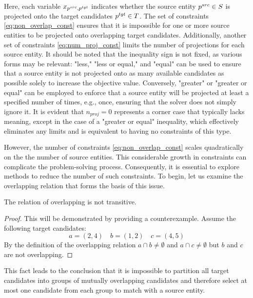 Here, each variable \( x_{p^{src}, p^{tgt}} \) indicates whether
the source entity \( p^{src} \in S \) is projected onto the target
candidates \( p^{tgt} \in T \). The set of constraints \eqref{eq:non_overlap_const}
ensures that it is impossible for one or more source entities to be
projected onto overlapping target candidates. Additionally, another
set of constraints \eqref{eq:num_proj_const} limits the number of
projections for each source entity. It should be noted that the
inequality sign is not fixed, as various forms may be relevant: "less,"
"less or equal," and "equal" can be used to ensure that a source entity
is not projected onto as many available candidates as possible solely to increase
the objective value. Conversely, "greater" or "greater or equal" can be
employed to enforce that a source entity will be projected at least a specified
number of times, e.g., once, ensuring that the solver does not simply ignore it.
It is evident that \( n_{proj} = 0 \) represents a corner case that typically
lacks meaning, except in the case of a "greater or equal" inequality, which effectively
eliminates any limits and is equivalent to having no constraints of this type.

However, the number of constraints \eqref{eq:non_overlap_const} scales quadratically on the the number of source entities.
This considerable growth in constraints can complicate the problem-solving process.
Consequently, it is essential to explore methods to reduce the number of such
constraints. To begin, let us examine the overlapping relation that forms the
basis of this issue.
\begin{lemma} \label{lemma:not_transitive}
  The relation of overlapping is not transitive.
\end{lemma}
\begin{proof}
  This will be demonstrated by providing a counterexample.
  Assume the following target candidates:
  \[
    a = (2, 4) \quad b = (1, 2) \quad c = (4, 5)
  \]
  By the definition of the overlapping relation \( a \cap b \neq \emptyset \) and
  \( a \cap c \neq \emptyset \) but \( b \) and \( c \) are not overlapping.
\end{proof}

This fact leads to the conclusion that it is impossible to partition all target
candidates into groups of mutually overlapping candidates and therefore select at most
one candidate from each group to match with a source entity.

